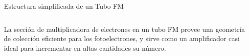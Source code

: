 \documentclass[a4paper,10pt]{beamer}
\begin{document}
\begin{frame}{Estructura simplificada de un Tubo FM}
\begin{columns}[c]
\begin{justify}
{   \vspace{.3cm}
   
   La sección de multiplicadora de electrones en un tubo FM provee una geometría
   de colección eficiente para los fotoelectrones, y sirve como un amplificador
   casi ideal para incrementar en altas cantidades su número.}
   
   
  \end{justify}

 \end{columns} 
 
\end{frame}
\end{document}
